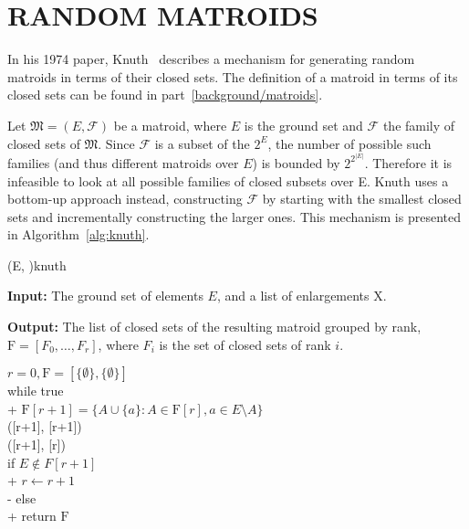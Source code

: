 \chapter{RANDOM MATROIDS}\label{random-matroids}

In his 1974 paper, Knuth~\cite{knuth-1975} describes a mechanism for generating random matroids in terms of their closed sets. The definition of a matroid in terms of its closed sets can be found in part~\ref{background/matroids}.

Let $\mathfrak{M} = (E, \mathcal{F})$ be a matroid, where $E$ is the ground set and $\mathcal{F}$ the family of closed sets of $\mathfrak{M}$. Since $\mathcal{F}$ is a subset of the $2^E$, the number of possible such families (and thus different matroids over $E$) is bounded by $2^{2^{|E|}}$. Therefore it is infeasible to look at all possible families of closed subsets over E. Knuth uses a bottom-up approach instead, constructing $\mathcal{F}$ by starting with the smallest closed sets and incrementally constructing the larger ones. This mechanism is presented in Algorithm~\ref{alg:knuth}.

\begin{algorithm}[float*=ht,width=\textwidth]{(E, )}{knuth}

  \textbf{Input:}     \tab The ground set of elements $E$, and a list of enlargements $\mathrm{X}$.

  \textbf{Output:}    \tab The list of closed sets of the resulting matroid grouped by rank, \\
  \mbox{}\tab $\mathrm{F} = [F_0, \ldots, F_r]$, where $F_i$ is the set of closed sets of rank $i$.

  \begin{pseudo}[label=\small\arabic*, indent-mark, line-height=1.1]
    $r = 0, \mathrm{F} = [\{ \emptyset \}, \{ \emptyset \}]$ \\
    while true  \\+
    $\mathrm{F}[r+1] = \{ A \cup \{a\} : A \in \mathrm{F}[r], a \in E \setminus A \}$\\
    ([r+1], [r+1]) \\
    ([r+1], [r]) \\

    if $E \not \in F[r+1]$ \\+
    $r \leftarrow r+1$ \\-
    else \\+
    return $\mathrm{F}$

  \end{pseudo}

\end{algorithm}

